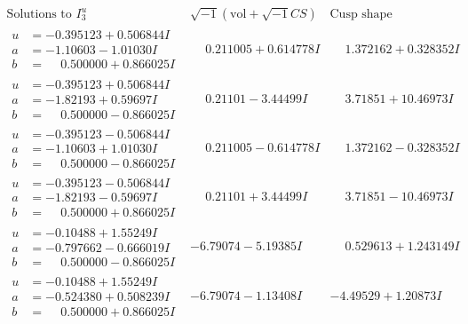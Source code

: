 \documentclass[1p]{elsarticle_modified}
\theoremstyle{definition}
\newcommand{\I}{\sqrt{-1}}
\begin{document}
$$\begin{array}{c|c|c}  
\text{Solutions to }I^u_{3}& \I (\text{vol} + \sqrt{-1}CS) & \text{Cusp shape}\\
 \hline 
\begin{aligned}
u &= -0.395123 + 0.506844 I \\
a &= -1.10603 - 1.01030 I \\
b &= \phantom{-}0.500000 + 0.866025 I\end{aligned}
 & \phantom{-}0.211005 + 0.614778 I & \phantom{-}1.372162 + 0.328352 I \\ \hline\begin{aligned}
u &= -0.395123 + 0.506844 I \\
a &= -1.82193 + 0.59697 I \\
b &= \phantom{-}0.500000 - 0.866025 I\end{aligned}
 & \phantom{-}0.21101 - 3.44499 I & \phantom{-}3.71851 + 10.46973 I \\ \hline\begin{aligned}
u &= -0.395123 - 0.506844 I \\
a &= -1.10603 + 1.01030 I \\
b &= \phantom{-}0.500000 - 0.866025 I\end{aligned}
 & \phantom{-}0.211005 - 0.614778 I & \phantom{-}1.372162 - 0.328352 I \\ \hline\begin{aligned}
u &= -0.395123 - 0.506844 I \\
a &= -1.82193 - 0.59697 I \\
b &= \phantom{-}0.500000 + 0.866025 I\end{aligned}
 & \phantom{-}0.21101 + 3.44499 I & \phantom{-}3.71851 - 10.46973 I \\ \hline\begin{aligned}
u &= -0.10488 + 1.55249 I \\
a &= -0.797662 - 0.666019 I \\
b &= \phantom{-}0.500000 - 0.866025 I\end{aligned}
 & -6.79074 - 5.19385 I & \phantom{-}0.529613 + 1.243149 I \\ \hline\begin{aligned}
u &= -0.10488 + 1.55249 I \\
a &= -0.524380 + 0.508239 I \\
b &= \phantom{-}0.500000 + 0.866025 I\end{aligned}
 & -6.79074 - 1.13408 I & -4.49529 + 1.20873 I \\ \hline\begin{aligned}

\end{aligned}
\end{array}$$
\end{document}
